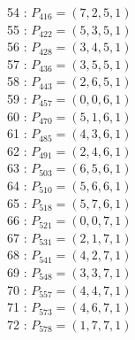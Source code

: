 \documentclass{article}
\begin{document}
{\begin{multicols}{3}
54 : $P_{416}=( 7, 2, 5, 1 )$\\
55 : $P_{422}=( 5, 3, 5, 1 )$\\
56 : $P_{428}=( 3, 4, 5, 1 )$\\
57 : $P_{436}=( 3, 5, 5, 1 )$\\
58 : $P_{443}=( 2, 6, 5, 1 )$\\
59 : $P_{457}=( 0, 0, 6, 1 )$\\
60 : $P_{470}=( 5, 1, 6, 1 )$\\
61 : $P_{485}=( 4, 3, 6, 1 )$\\
62 : $P_{491}=( 2, 4, 6, 1 )$\\
63 : $P_{503}=( 6, 5, 6, 1 )$\\
64 : $P_{510}=( 5, 6, 6, 1 )$\\
65 : $P_{518}=( 5, 7, 6, 1 )$\\
66 : $P_{521}=( 0, 0, 7, 1 )$\\
67 : $P_{531}=( 2, 1, 7, 1 )$\\
68 : $P_{541}=( 4, 2, 7, 1 )$\\
69 : $P_{548}=( 3, 3, 7, 1 )$\\
70 : $P_{557}=( 4, 4, 7, 1 )$\\
71 : $P_{573}=( 4, 6, 7, 1 )$\\
72 : $P_{578}=( 1, 7, 7, 1 )$\\
\end{multicols}


%


%


}%
\end{document}

